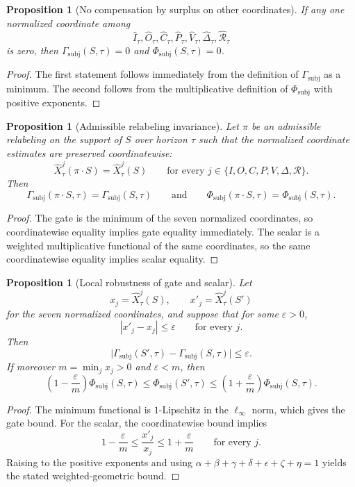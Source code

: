 \documentclass[11pt,a4paper]{article}
\newtheorem{proposition}[theorem]{Proposition}
\theoremstyle{definition}
\newcommand{\SelfIndex}{I}
\newcommand{\OwnField}{O}
\newcommand{\ContField}{C}
\newcommand{\Persp}{P}
\newcommand{\ValAsym}{V}
\newcommand{\IntervProf}{\Delta}
\newcommand{\Irred}{\mathcal{R}}
\newcommand{\GateSubj}{\Gamma_{\mathrm{subj}}}
\newcommand{\PhiSubj}{\Phi_{\mathrm{subj}}}
\begin{document}
\begin{proposition}[No compensation by surplus on other coordinates]
If any one normalized coordinate among
\[
\widehat{\SelfIndex}_\tau,\widehat{\OwnField}_\tau,\widehat{\ContField}_\tau,\widehat{\Persp}_\tau,\widehat{\ValAsym}_\tau,\widehat{\IntervProf}_\tau,\widehat{\Irred}_\tau
\]
is zero, then $\GateSubj(S,\tau)=0$ and $\PhiSubj(S,\tau)=0$.
\end{proposition}

\begin{proof}
The first statement follows immediately from the definition of $\GateSubj$ as a minimum. The second follows from the multiplicative definition of $\PhiSubj$ with positive exponents.
\end{proof}

\begin{proposition}[Admissible relabeling invariance]\label{prop:relabelinv}
Let $\pi$ be an admissible relabeling on the support of $S$ over horizon $\tau$ such that the normalized coordinate estimates are preserved coordinatewise:
\[
\widehat{X}_\tau^j(\pi\cdot S)=\widehat{X}_\tau^j(S)
\qquad
\text{for every }j\in\{\SelfIndex,\OwnField,\ContField,\Persp,\ValAsym,\IntervProf,\Irred\}.
\]
Then
\[
\GateSubj(\pi\cdot S,\tau)=\GateSubj(S,\tau)
\qquad\text{and}\qquad
\PhiSubj(\pi\cdot S,\tau)=\PhiSubj(S,\tau).
\]
\end{proposition}

\begin{proof}
The gate is the minimum of the seven normalized coordinates, so coordinatewise equality implies gate equality immediately. The scalar is a weighted multiplicative functional of the same coordinates, so the same coordinatewise equality implies scalar equality.
\end{proof}

\begin{proposition}[Local robustness of gate and scalar]\label{prop:localrobust}
Let
\[
x_j=\widehat{X}_\tau^j(S),\qquad x'_j=\widehat{X}_\tau^j(S')
\]
for the seven normalized coordinates, and suppose that for some $\varepsilon>0$,
\[
|x'_j-x_j|\le \varepsilon
\qquad
\text{for every }j.
\]
Then
\[
\big|\GateSubj(S',\tau)-\GateSubj(S,\tau)\big|\le \varepsilon.
\]
If moreover $m=\min_j x_j>0$ and $\varepsilon<m$, then
\[
\left(1-\frac{\varepsilon}{m}\right)\PhiSubj(S,\tau)
\le
\PhiSubj(S',\tau)
\le
\left(1+\frac{\varepsilon}{m}\right)\PhiSubj(S,\tau).
\]
\end{proposition}

\begin{proof}
The minimum functional is $1$-Lipschitz in the $\ell_\infty$ norm, which gives the gate bound. For the scalar, the coordinatewise bound implies
\[
1-\frac{\varepsilon}{m}
\le
\frac{x'_j}{x_j}
\le
1+\frac{\varepsilon}{m}
\qquad
\text{for every }j.
\]
Raising to the positive exponents and using $\alpha+\beta+\gamma+\delta+\epsilon+\zeta+\eta=1$ yields the stated weighted-geometric bound.
\end{proof}
\end{document}
